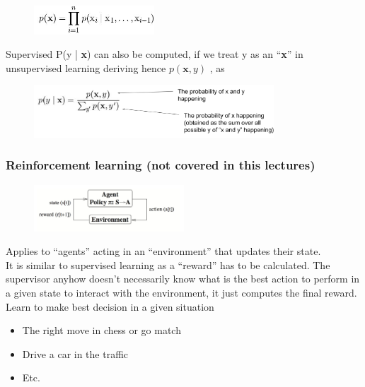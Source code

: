 \begin{figure}[ht]
	\centering
	\includegraphics[width=0.4\textwidth]{figure_ml/s_vs_u.png}
\end{figure}
\FloatBarrier

Supervised P(y | \textbf{x}) can also be computed, if we treat y as an “\textbf{x}” in unsupervised learning deriving hence $p(\textbf{x},y)$
, as


\begin{figure}[ht]
	\centering
	\includegraphics[width=0.8\textwidth]{figure_ml/s_vs_u2.png}
\end{figure}
\FloatBarrier

\subsubsection{Reinforcement learning (not covered in this lectures)}
\begin{figure}
	\includegraphics[width=0.5\textwidth]{figure_ml/reinforcement_learning.png}
\end{figure} 

Applies to “agents” acting in an “environment” that updates their state.\\
It is similar to supervised learning as a “reward” has to be calculated. The supervisor anyhow doesn’t necessarily know what is the best action to perform in a given state to interact with the environment, it just computes the final reward.\\
Learn to make best decision in a given situation
\begin{itemize}
	\item The right move in chess or go match
	\item Drive a car in the traffic
	\item Etc.
\end{itemize}


